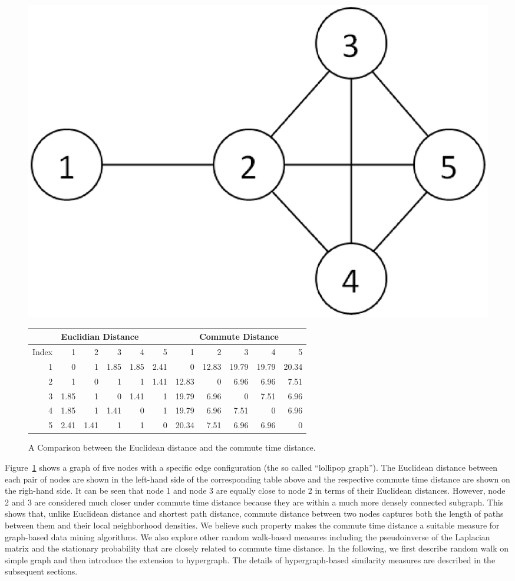 \begin{figure}[tbh]
\centering
\begin{minipage}[c]{\textwidth}\centering
\includegraphics[width=.4\textwidth]{fig/comm-dist-demo.eps}
\end{minipage}
\hfill
\begin{minipage}[c]{\textwidth}\centering
\begin{tabular}{r|r|r|r|r|r || r|r|r|r|r}
\hline\hline
\multicolumn{6}{c||}{Euclidian Distance}	&	\multicolumn{5}{c}{Commute Distance}		\\
\hline\hline							
Index	&	1	&	2	&	3	&	4	&	5	&	1	&	2	&	3	&	4	&	5	\\
\hline
1	&	0	&	1	&	1.85	&	1.85	&	2.41	&	0	&	12.83	&	19.79	&	19.79	&	20.34	\\
\hline
2	&	1	&	0	&	1	&	1	&	1.41	&	12.83	&	0	&	6.96	&	6.96	&	7.51	\\
\hline
3	&	1.85	&	1	&	0	&	1.41	&	1	&	19.79	&	6.96	&	0	&	7.51	&	6.96	\\
\hline
4	&	1.85	&	1	&	1.41	&	0	&	1	&	19.79	&	6.96	&	7.51	&	0	&	6.96	\\
\hline
5	&	2.41	&	1.41	&	1	&	1	&	0	&	20.34	&	7.51	&	6.96	&	6.96	&	0	\\
\hline\hline
\end{tabular}
\end{minipage}
\caption{\label{fig:cd-demo} A Comparison between the Euclidean distance and the commute time distance.}
\end{figure}

Figure~\ref{fig:cd-demo} shows a graph of five nodes with a specific edge configuration (the so called ``lollipop graph''). The Euclidean distance between each pair of nodes are shown in the left-hand side of the corresponding table above and the respective commute time distance are shown on the righ-hand side. It can be seen that node 1 and node 3 are equally close to node 2 in terms of their Euclidean distances. However, node 2 and 3 are considered much closer under commute time distance because they are within a much more densely connected subgraph. This shows that, unlike Euclidean distance and shortest path distance, commute distance between two nodes captures both the length of paths between them and their local neighborhood densities. We believe such property makes the commute time distance a suitable measure for graph-based data mining algorithms. We also explore other random walk-based measures including the pseudoinverse of the Laplacian matrix and the stationary probability that are closely related to commute time distance. In the following, we first describe random walk on simple graph and then introduce the extension to hypergraph. The details of hypergraph-based similarity measures are described in the subsequent sections.

